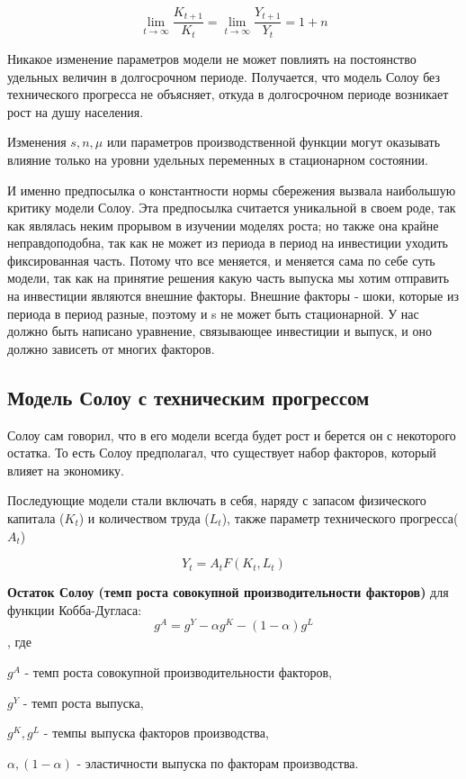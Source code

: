 \documentclass[reqno]{article}
\theoremstyle{definition}
\theoremstyle{definition}
\theoremstyle{definition}
\theoremstyle{definition}
\theoremstyle{definition}
\theoremstyle{definition}
\theoremstyle{definition}
\theoremstyle{definition}
\theoremstyle{definition}
\begin{document}
	$$\lim_{t \rightarrow \infty} \frac{K_{t+1}}{K_t} = \lim_{t \rightarrow \infty} \frac{Y_{t+1}}{Y_t} = 1 + n$$
	
	Никакое изменение параметров модели не может повлиять на постоянство удельных величин в долгосрочном периоде. Получается, что модель Солоу без технического прогресса не объясняет, откуда в долгосрочном периоде возникает рост на душу населения.
	
	Изменения $s, n, \mu$ или параметров производственной функции могут оказывать влияние только на уровни удельных переменных в стационарном состоянии.
	
	И именно предпосылка о константности нормы сбережения вызвала наибольшую критику модели Солоу. Эта предпосылка считается уникальной в своем роде, так как являлась неким прорывом в изучении моделях роста; но также она крайне неправдоподобна, так как не может из периода в период на инвестиции уходить фиксированная часть. Потому что все меняется, и меняется сама по себе суть модели, так как на принятие решения какую часть выпуска мы хотим отправить на инвестиции являются внешние факторы. Внешние факторы - шоки, которые из периода в период разные, поэтому и s не может быть стационарной. У нас должно быть написано уравнение, связывающее инвестиции и выпуск, и оно должно зависеть от многих факторов.
	
	\subsection{Модель Солоу с техническим прогрессом}
	
	Солоу сам говорил, что в его модели всегда будет рост и берется он с некоторого остатка. То есть Солоу предполагал, что существует набор факторов, который влияет на экономику.
	
	Последующие модели стали включать в себя, наряду с запасом физического капитала ($K_t$) и количеством труда ($L_t$), также параметр технического прогресса($A_t$)
	
	$$Y_t = A_t F(K_t,L_t)$$
	
	\textbf{Остаток Солоу (темп роста совокупной производительности факторов)} для функции Кобба-Дугласа:
	$$g^A = g^Y - \alpha g^K - (1 - \alpha) g^L$$
	, где
	
	$g^A$ - темп роста совокупной производительности факторов,
	
	$g^Y$ - темп роста выпуска,
	
	$g^K, g^L$ - темпы выпуска факторов производства,
	
	$\alpha, (1 - \alpha)$ - эластичности выпуска по факторам производства.
	
\end{document}
